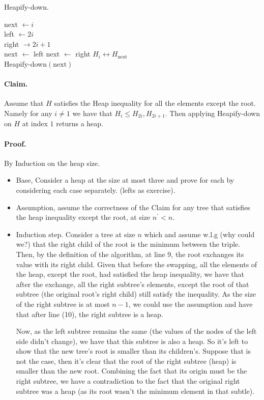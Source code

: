 \begin{algbox}{Heapify-down.}
\begin{algorithm}[H]
next  $\leftarrow i  $ \\
left  $\leftarrow 2i $ \\
right $\rightarrow 2i +1 $ \\ 
 {
  next $\leftarrow$ left 
}
 {
  next $\leftarrow$  right
}
 {
  $ H_{i} \leftrightarrow H_{\text{next}} $ \\ 
  Heapify-down$\left( \text{next}  \right)$
}
\end{algorithm}
\end{algbox}
\paragraph{Claim.} Assume that $H$ satisfies the Heap inequality for all the elements except the root. Namely for any $i \neq 1$ we have that $H_{i} \le H_{2i}, H_{2i+1}$. Then applying Heapify-down on $H$ at index $1$ returns a heap.  
\paragraph{Proof.} By Induction on the heap size.  
 
\begin{itemize} 
  \item Base, Consider a heap at the size at most three and prove for each by considering each case separately. (lefts as exercise).  
  \item Assumption, assume the correctness of the Claim for any tree that satisfies the heap inequality except the root, at size $n^{\prime} < n$. 
  \item Induction step. Consider a tree at size $n$ which and assume w.l.g (why could we?) that the right child of the root is the minimum between the triple. Then, by the definition of the algorithm, at line 9, the root exchanges its value with its right child. Given that before the swapping, all the elements of the heap, except the root, had satisfied the heap inequality, we have that after the exchange, all the right subtree's elements, except the root of that subtree (the original root's right child) still satisfy the inequality. As the size of the right subtree is at most $n-1$, we could use the assumption and have that after line (10), the right subtree is a heap.  
 
    Now, as the left subtree remains the same (the values of the nodes of the left side didn't change), we have that this subtree is also a heap. So it's left to show that the new tree's root is smaller than its children's. Suppose that is not the case, then it's clear that the root of the right subtree (heap) is smaller than the new root. Combining the fact that its origin must be the right subtree, we have a contradiction to the fact that the original right subtree was a heap (as its root wasn't the minimum element in that subtle).  
 
\end{itemize} 
